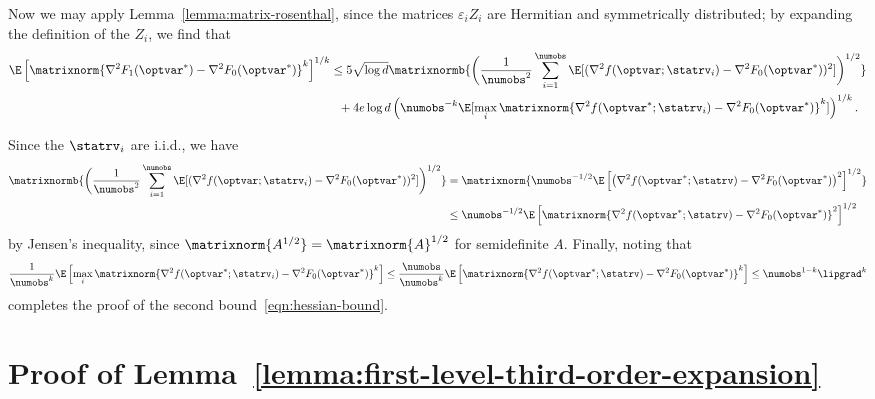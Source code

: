 \documentclass[11pt,twoside]{article}
\theoremstyle{definition}
\begin{document}
Now we may apply Lemma~\ref{lemma:matrix-rosenthal}, since the
matrices $\varepsilon_i Z_i$ are Hermitian and symmetrically
distributed; by expanding the
definition of the $Z_i$, we find that
\begin{align*}
  \E\left[\matrixnorm{\nabla^2 F_1(\optvar^*)
        - \nabla^2 F_0(\optvar^*)}^k\right]^{1/k}
  & \le 5 \sqrt{\log d}
  \matrixnormb{\bigg(\frac{1}{\numobs^2} \sum_{i=1}^\numobs
    \E[(\nabla^2 f(\optvar; \statrv_i) - \nabla^2 F_0(\optvar^*))^2]
    \bigg)^{1/2}} \\
  & ~~ + 4 e \log d \left(\numobs^{-k} \E[\max_i
    \matrixnorm{\nabla^2 f(\optvar^*; \statrv_i)
      - \nabla^2 F_0(\optvar^*)}^k]\right)^{1/k}.
\end{align*}

Since the $\statrv_i$ are i.i.d., we have
\begin{align*}
  \matrixnormb{\bigg(\frac{1}{\numobs^2} \sum_{i=1}^\numobs
    \E[(\nabla^2 f(\optvar; \statrv_i) - \nabla^2 F_0(\optvar^*))^2]
    \bigg)^{1/2}}
  & = \matrixnorm{\numobs^{-1/2} \E\left[\left(
      \nabla^2 f(\optvar^*; \statrv) - \nabla^2 F_0(\optvar^*)\right)^2
      \right]^{1/2}} \\
  & \le \numobs^{-1/2} \E\left[\matrixnorm{\nabla^2 f(\optvar^*; \statrv)
      - \nabla^2 F_0(\optvar^*)}^2\right]^{1/2}
\end{align*}
by Jensen's inequality, since $\matrixnorm{A^{1/2}} = \matrixnorm{A}^{1/2}$
for semidefinite $A$.
Finally, noting that
\begin{equation*}
  \frac{1}{\numobs^{k}}
  \E\left[\max_i \matrixnorm{\nabla^2 f(\optvar^*; \statrv_i) - \nabla^2 F_0(
      \optvar^*)}^k\right]
  \le \frac{\numobs}{\numobs^{k}} \E\left[
    \matrixnorm{\nabla^2 f(\optvar^*; \statrv) - \nabla^2 F_0(
      \optvar^*)}^k\right]
  \le \numobs^{1-k} \lipgrad^k
\end{equation*}
completes the proof of the second bound~\eqref{eqn:hessian-bound}.






\section{Proof of Lemma~\ref{lemma:first-level-third-order-expansion}}
\label{sec:proof-third-order-expansion}
\end{document}
